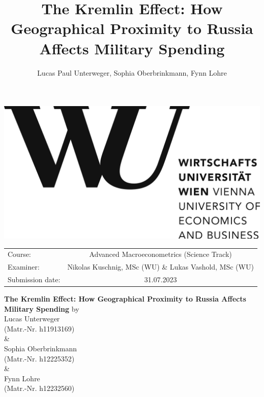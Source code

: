 \documentclass[12pt,a4paper]{article}
\author{Lucas Paul Unterweger, Sophia Oberbrinkmann, Fynn Lohre}
\title{The Kremlin Effect: How Geographical Proximity to Russia Affects Military Spending}
\begin{document}
\begin{titlepage}
\center
\vfill
\includegraphics[scale=0.08]{WU.png}
\vfill
\begin{tabular}[t]{lc}
Course:  & Advanced Macroeconometrics (Science Track) \\
Examiner: & 
Nikolas Kuschnig, MSc (WU) \& Lukas Vashold, MSc (WU) \\
Submission date: & 31.07.2023 \\
\end{tabular}
\vfill
{\large \textbf{The Kremlin Effect: How Geographical Proximity to Russia Affects Military Spending}}
\vfill
by\\ \vspace{3mm}
{\Large Lucas Unterweger}\\
(Matr.-Nr. h11913169)\\ \vspace{3mm}
\& \\ \vspace{3mm}
{\Large Sophia Oberbrinkmann}\\
(Matr.-Nr. h12225352)\\ \vspace{3mm}
\& \\ \vspace{3mm}
{\Large Fynn Lohre}\\
(Matr.-Nr. h12232560)\
\vfill

\thispagestyle{empty}
\pagebreak
\end{titlepage}
\thispagestyle{empty}
\end{document}
